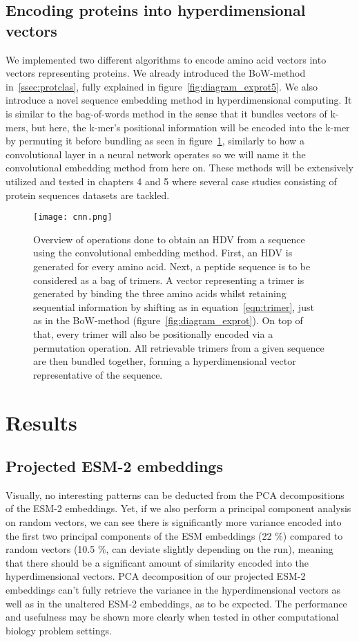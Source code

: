 \subsection{Encoding proteins into hyperdimensional vectors}\label{ssec:protseq}
We implemented two different algorithms to encode amino acid vectors into vectors representing proteins. We already introduced the BoW-method in~\ref{ssec:protclas}, fully explained in figure~\ref{fig:diagram_exprot5}. We also introduce a novel sequence embedding method in hyperdimensional computing.  It is similar to the bag-of-words method in the sense that it bundles vectors of k-mers, but here, the k-mer's positional information will be encoded into the k-mer by permuting it before bundling as seen in figure~\ref{fig:cnn}, similarly to how a convolutional layer in a neural network operates so we will name it the convolutional embedding method from here on. These methods will be extensively utilized and tested in chapters 4 and 5 where several case studies consisting of protein sequences datasets are tackled.

\begin{figure}[ht!]
    \centering
    \texttt{[image: cnn.png]}
    \caption{Overview of operations done to obtain an HDV from a sequence using the convolutional embedding method. First, an HDV is generated for every amino acid. Next, a peptide sequence is to be considered as a bag of trimers. A vector representing a trimer is generated by binding the three amino acids whilst retaining sequential information by shifting as in equation~\ref{eqn:trimer}, just as in the BoW-method (figure~\ref{fig:diagram_exprot}). On top of that, every trimer will also be positionally encoded via a permutation operation. All retrievable trimers from a given sequence are then bundled together, forming a hyperdimensional vector representative of the sequence.}\label{fig:cnn}
\end{figure}

\section{Results}
\subsection{Projected ESM-2 embeddings}
Visually, no interesting patterns can be deducted from the PCA decompositions of the ESM-2 embeddings. Yet, if we also perform a principal component analysis on random vectors, we can see there is significantly more variance encoded into the first two principal components of the ESM embeddings (22 \%) compared to random vectors (10.5 \%, can deviate slightly depending on the run), meaning that there should be a significant amount of similarity encoded into the hyperdimensional vectors. PCA decomposition of our projected ESM-2 embeddings can't fully retrieve the variance in the hyperdimensional vectors as well as in the unaltered ESM-2 embeddings, as to be expected. The performance and usefulness may be shown more clearly when tested in other computational biology problem settings.

